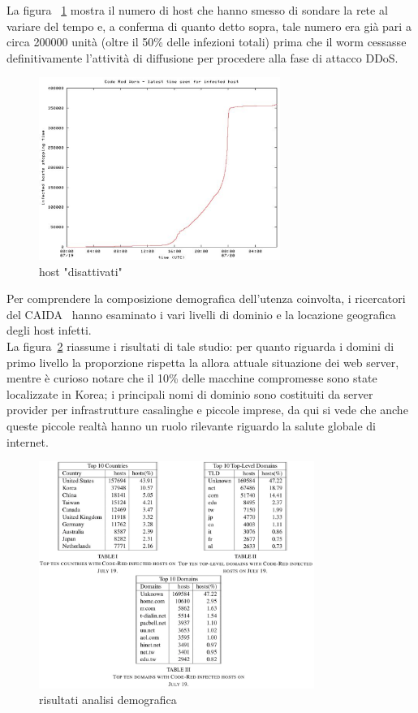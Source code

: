 La figura ~\ref{deactivated} mostra il numero di host che hanno smesso di sondare la rete al variare del tempo e, a conferma di quanto detto sopra, tale numero era già pari a circa 200000 unità (oltre il 50\% delle infezioni totali) prima che il worm cessasse definitivamente l’attività di diffusione per procedere alla fase di attacco DDoS.\\
\begin{figure}[!hbp]
\centering
\includegraphics[width=0.7\textwidth]{images/deactivated.eps}
\caption{host "disattivati"}
\label{deactivated}
\end{figure}
Per comprendere la composizione demografica dell’utenza coinvolta, i ricercatori del CAIDA~\cite{caida} hanno esaminato i vari livelli di dominio e la locazione geografica degli host infetti.\\
La figura~\ref{domains} riassume i risultati di tale studio: per quanto riguarda i domini di primo livello la proporzione rispetta la allora attuale situazione dei web server, mentre è curioso notare che il 10\% delle macchine compromesse sono state localizzate in Korea; i principali nomi di dominio sono costituiti da server provider per infrastrutture casalinghe e piccole imprese, da qui si vede che anche queste piccole realtà hanno un ruolo rilevante riguardo la salute globale di internet.\\
\begin{figure}[!hbp]
\centering
\includegraphics[width=0.8\textwidth]{images/domains.eps}
\caption{risultati analisi demografica}
\label{domains}
\end{figure}

